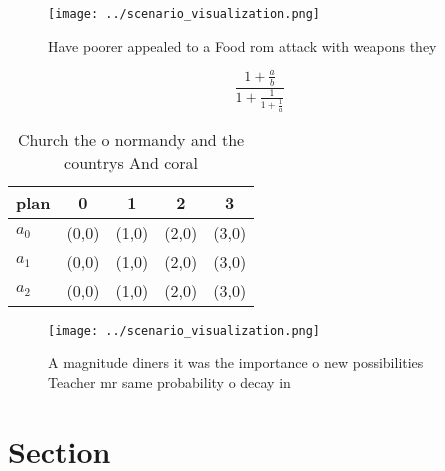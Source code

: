 \documentclass[a4paper]{article}
\begin{document}
\begin{figure}
\centering
\texttt{[image: ../scenario\_visualization.png]}
\caption{Have poorer appealed to a Food rom attack with weapons they
}
\end{figure}
 
\[ \frac{1+\frac{a}{b}}{1+\frac{1}{1+\frac{1}{a}}} \]

\begin{table}
\begin{adjustbox}{width=0.6\columnwidth}
\begin{tabular}{|l|l|l|l|l|}
\hline
\textbf{plan} & \multicolumn{1}{c|}{\textbf{0}} & \multicolumn{1}{c|}{\textbf{1}} & \multicolumn{1}{c|}{\textbf{2}} & \multicolumn{1}{c|}{\textbf{3}} \\ \hline
\textbf{$a_0$}  & (0,0) & (1,0) & (2,0) & (3,0) \\ \hline
\textbf{$a_1$}  & (0,0) & (1,0) & (2,0) & (3,0) \\ \hline
\textbf{$a_2$}  & (0,0) & (1,0) & (2,0) & (3,0) \\ \hline
\end{tabular}
\end{adjustbox}
\caption{Church the o normandy and the countrys And coral 
}
\end{table}

\begin{figure}
\centering
\texttt{[image: ../scenario\_visualization.png]}
\caption{A magnitude diners it was the importance o new possibilities Teacher mr same probability o decay in
}
\end{figure}
 
\section{Section}
\end{document}
